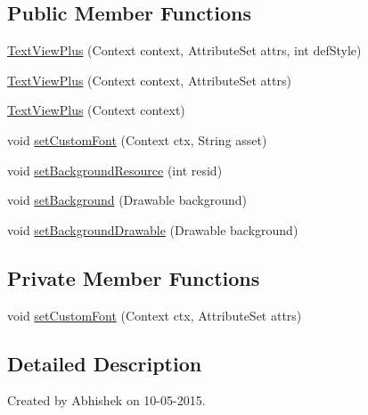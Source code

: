 \subsection*{Public Member Functions}
\begin{DoxyCompactItemize}
\item 
\hyperlink{classorg_1_1buildmlearn_1_1toolkit_1_1views_1_1TextViewPlus_a7fa4bf12efffc541314f6eb6b14503d4}{Text\+View\+Plus} (Context context, Attribute\+Set attrs, int def\+Style)
\item 
\hyperlink{classorg_1_1buildmlearn_1_1toolkit_1_1views_1_1TextViewPlus_aca058cffb6db170aaa914b82f91b674b}{Text\+View\+Plus} (Context context, Attribute\+Set attrs)
\item 
\hyperlink{classorg_1_1buildmlearn_1_1toolkit_1_1views_1_1TextViewPlus_ae6712af05da2664bb1712ef7bd204e23}{Text\+View\+Plus} (Context context)
\item 
void \hyperlink{classorg_1_1buildmlearn_1_1toolkit_1_1views_1_1TextViewPlus_ac0ca554472ccd1ee1ba15c11ea6e24ab}{set\+Custom\+Font} (Context ctx, String asset)
\item 
void \hyperlink{classorg_1_1buildmlearn_1_1toolkit_1_1views_1_1TextViewPlus_a0d52d41fd4c9baf6e949c72e7c3f9603}{set\+Background\+Resource} (int resid)
\item 
void \hyperlink{classorg_1_1buildmlearn_1_1toolkit_1_1views_1_1TextViewPlus_af52318bfe2778c95e9b2565999842079}{set\+Background} (Drawable background)
\item 
void \hyperlink{classorg_1_1buildmlearn_1_1toolkit_1_1views_1_1TextViewPlus_a4739d5c108dd898bd6d250bfa9a7f893}{set\+Background\+Drawable} (Drawable background)
\end{DoxyCompactItemize}
\subsection*{Private Member Functions}
\begin{DoxyCompactItemize}
\item 
void \hyperlink{classorg_1_1buildmlearn_1_1toolkit_1_1views_1_1TextViewPlus_aba2e6cfd744dc28aa9401e1d2a1d9e81}{set\+Custom\+Font} (Context ctx, Attribute\+Set attrs)
\end{DoxyCompactItemize}


\subsection{Detailed Description}
Created by Abhishek on 10-\/05-\/2015. 

